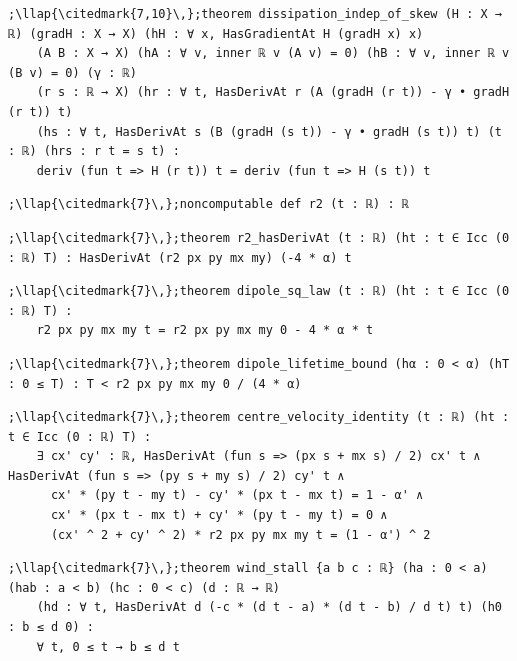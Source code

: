 \begin{lstlisting}[style=leancat]
;\llap{\citedmark{7,10}\,};theorem dissipation_indep_of_skew (H : X → ℝ) (gradH : X → X) (hH : ∀ x, HasGradientAt H (gradH x) x)
    (A B : X → X) (hA : ∀ v, inner ℝ v (A v) = 0) (hB : ∀ v, inner ℝ v (B v) = 0) (γ : ℝ)
    (r s : ℝ → X) (hr : ∀ t, HasDerivAt r (A (gradH (r t)) - γ • gradH (r t)) t)
    (hs : ∀ t, HasDerivAt s (B (gradH (s t)) - γ • gradH (s t)) t) (t : ℝ) (hrs : r t = s t) :
    deriv (fun t => H (r t)) t = deriv (fun t => H (s t)) t
\end{lstlisting}

\begin{lstlisting}[style=leancat]
;\llap{\citedmark{7}\,};noncomputable def r2 (t : ℝ) : ℝ
\end{lstlisting}

\begin{lstlisting}[style=leancat]
;\llap{\citedmark{7}\,};theorem r2_hasDerivAt (t : ℝ) (ht : t ∈ Icc (0 : ℝ) T) : HasDerivAt (r2 px py mx my) (-4 * α) t
\end{lstlisting}

\begin{lstlisting}[style=leancat]
;\llap{\citedmark{7}\,};theorem dipole_sq_law (t : ℝ) (ht : t ∈ Icc (0 : ℝ) T) :
    r2 px py mx my t = r2 px py mx my 0 - 4 * α * t
\end{lstlisting}

\begin{lstlisting}[style=leancat]
;\llap{\citedmark{7}\,};theorem dipole_lifetime_bound (hα : 0 < α) (hT : 0 ≤ T) : T < r2 px py mx my 0 / (4 * α)
\end{lstlisting}

\begin{lstlisting}[style=leancat]
;\llap{\citedmark{7}\,};theorem centre_velocity_identity (t : ℝ) (ht : t ∈ Icc (0 : ℝ) T) :
    ∃ cx' cy' : ℝ, HasDerivAt (fun s => (px s + mx s) / 2) cx' t ∧ HasDerivAt (fun s => (py s + my s) / 2) cy' t ∧
      cx' * (py t - my t) - cy' * (px t - mx t) = 1 - α' ∧
      cx' * (px t - mx t) + cy' * (py t - my t) = 0 ∧
      (cx' ^ 2 + cy' ^ 2) * r2 px py mx my t = (1 - α') ^ 2
\end{lstlisting}

\begin{lstlisting}[style=leancat]
;\llap{\citedmark{7}\,};theorem wind_stall {a b c : ℝ} (ha : 0 < a) (hab : a < b) (hc : 0 < c) (d : ℝ → ℝ)
    (hd : ∀ t, HasDerivAt d (-c * (d t - a) * (d t - b) / d t) t) (h0 : b ≤ d 0) :
    ∀ t, 0 ≤ t → b ≤ d t
\end{lstlisting}

